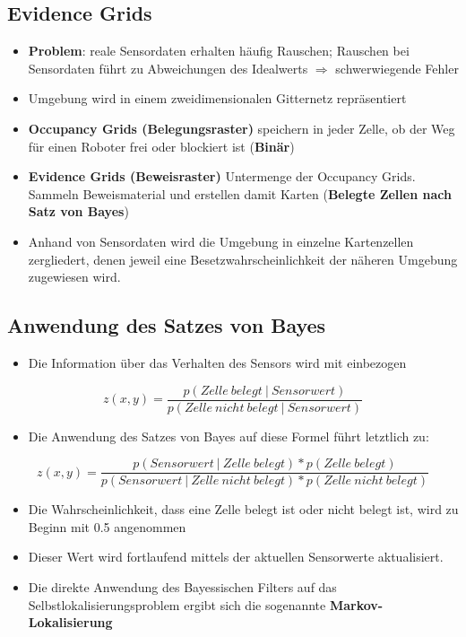 \subsection{Evidence Grids}
\begin{itemize}
	\item \textbf{Problem}: reale Sensordaten erhalten häufig Rauschen; Rauschen bei Sensordaten führt zu Abweichungen des Idealwerts $\Rightarrow$ schwerwiegende Fehler
	\item Umgebung wird in einem zweidimensionalen Gitternetz repräsentiert
	\item \textbf{Occupancy Grids (Belegungsraster)} speichern in jeder Zelle, ob der Weg für einen Roboter frei oder blockiert ist (\textbf{Binär})
	\item \textbf{Evidence Grids (Beweisraster)} Untermenge der Occupancy Grids. Sammeln Beweismaterial und erstellen damit Karten (\textbf{Belegte Zellen nach Satz von Bayes})
	\item Anhand von Sensordaten wird die Umgebung in einzelne Kartenzellen zergliedert, denen jeweil eine Besetzwahrscheinlichkeit der näheren Umgebung zugewiesen wird.
\end{itemize}
\subsection{Anwendung des Satzes von Bayes}
\begin{itemize}
	\item Die Information über das Verhalten des Sensors wird mit einbezogen
\end{itemize}
\[
	z(x,y)= \frac{p(Zelle \ belegt \ | \ Sensorwert)}{p(Zelle \ nicht \ belegt \ | \ Sensorwert)}
\]
\begin{itemize}
	\item Die Anwendung des Satzes von Bayes auf diese Formel führt letztlich zu:
\end{itemize}
\[
	z(x,y) = \frac{p(Sensorwert \ | \ Zelle  \ belegt) * p(Zelle \ belegt)}{p(Sensorwert \ | \ Zelle \ nicht \ belegt) * p(Zelle \ nicht \ belegt)}
\]
\begin{itemize}
	\item Die Wahrscheinlichkeit, dass eine Zelle belegt ist oder nicht belegt ist, wird zu Beginn mit 0.5 angenommen
	\item Dieser Wert wird fortlaufend mittels der aktuellen Sensorwerte aktualisiert.
	\item Die direkte Anwendung des Bayessischen Filters auf das Selbstlokalisierungsproblem ergibt sich die sogenannte \textbf{Markov-Lokalisierung}
\end{itemize}
